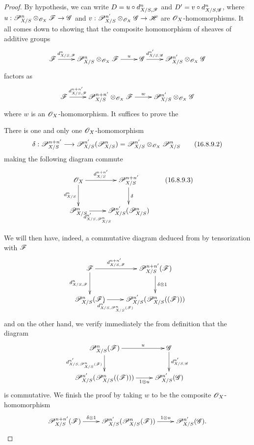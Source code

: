 \begin{proof}
By hypothesis, we can write $D = u \circ d_{X/S, \mathscr{F}}^n$ and $D' = v \circ d_{X/S, \mathscr{G}}^n$, where $u: \sh{P}_{X/S}^n \otimes_{\sh{O}_X} \sh{F} \to \sh{G}$ and $v: \sh{P}_{X/S}^{n'} \otimes_{\sh{O}_X} \sh{G} \to \sh{H} $ are $\mathscr{O}_X$-homomorphisms.
It all comes down to showing that the composite homomorphism of sheaves of additive groups
\[
  \xymatrix{
    \sh{F} \ar[r]^-{d_{X/S, \sh{F}}^n} & \sh{P}_{X/S}^n \otimes_{\sh{O}_X} \sh{F} \ar[r]^-u & \sh{G} \ar[r]^-{d_{X/S, \sh{G}}^{n'}} & \sh{P}_{X/S}^{n'} \otimes_{\sh{O}_X} \sh{G}
  }
\]
factors as
\[
  \xymatrix{
    \sh{F} \ar[r]^-{d_{X/S, \sh{F}}^{n + n'}} & \sh{P}_{X/S}^{n + n'} \otimes_{\sh{O}_X} \sh{F} \ar[r]^-w &  \sh{P}_{X/S}^{n'} \otimes_{\sh{O}_X} \sh{G}
  }
\]
where $w$ is an $\mathscr{O}_X$-homomorphism.
It suffices to prove the 
\begin{lemma}[16.8.9.1]
\label{IV.16.8.9.1}
There is one and only one $\mathscr{O}_X$-homomorphism
\[
  \label{IV.16.8.9.2}
  \delta: \sh{P}_{X/S}^{n + n'} \to \sh{P}_{X/S}^{n'}(\sh{P}_{X/S}^n) = \sh{P}_{X/S}^{n'} \otimes_{\sh{O}_X} \sh{P}_{X/S}^n 
  \tag{16.8.9.2}
\]
making the following diagram commute
\[
  \label{IV.16.8.9.3}
  \xymatrix{
    \sh{O}_X \ar[r]^-{d_{X/S}^{n + n'}} \ar[d]_-{d_{X/S}^{n}} & \sh{P}_{X/S}^{n + n'} \ar[d]^-\delta \\
    \sh{P}_{X/S}^n \ar[r]_-{d_{X/S, \sh{P}_{X/S}^n}^{n'}} & \sh{P}_{X/S}^{n'} (\sh{P}_{X/S}^n)
  }
  \tag{16.8.9.3}
\]
\end{lemma}

We will then have, indeed, a commutative diagram deduced from  by tensorization with $\mathscr{F}$
\[
  \xymatrix{
    \sh{F} \ar[r]^-{d_{X/S, \sh{F}}^{n + n'}} \ar[d]_-{d_{X/S, \sh{F}}^{n}} & \sh{P}_{X/S}^{n + n'}(\sh{F}) \ar[d]^-{\delta \otimes 1} \\
    \sh{P}_{X/S}^n(\sh{F}) \ar[r]_-{d_{X/S, \sh{P}_{X/S}^n(\sh{F})}^{n'}} & \sh{P}_{X/S}^{n'} (\sh{P}_{X/S}^n((\sh{F})))
  }
\]
and on the other hand, we verify immediately the from definition  that the diagram
\[
  \xymatrix{
    \sh{P}_{X/S}^n(\sh{F}) \ar[r]^-{u} \ar[d]_-{d_{X/S, \sh{P}_{X/S}^n(\sh{F})}^{n'}} & \sh{G} \ar[d]^-{d_{X/S, \sh{G}}^{n'}} \\
    \sh{P}_{X/S}^{n'} (\sh{P}_{X/S}^n((\sh{F}))) \ar[r]_-{1 \otimes u} & \sh{P}_{X/S}^{n'}(\sh{G})
  }
\]
is commutative.
We finish the proof by taking $w$ to be the composite $\mathscr{O}_X$-homomorphism
\[
  \xymatrix{
    \sh{P}_{X/S}^{n+n'}(\sh{F}) \ar[r]^-{\delta \otimes 1} & \sh{P}_{X/S}^{n'}(\sh{P}_{X/S}^n(\sh{F})) \ar[r]^-{1 \otimes u} & \sh{P}_{X/S}^{n'}(\sh{G}).
  }
\]
\end{proof}

